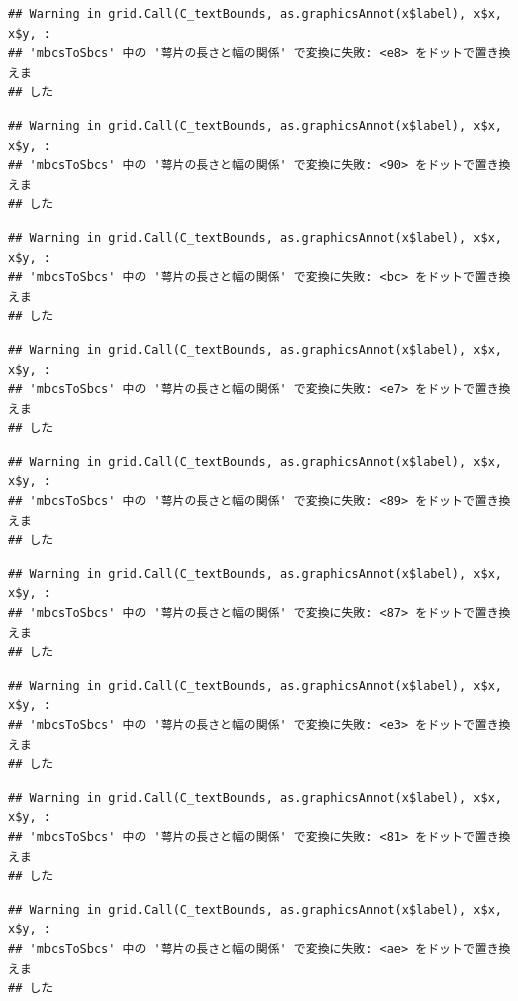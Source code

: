 \documentclass[
]{book}
\begin{document}
\begin{verbatim}
## Warning in grid.Call(C_textBounds, as.graphicsAnnot(x$label), x$x, x$y, :
## 'mbcsToSbcs' 中の '萼片の長さと幅の関係' で変換に失敗: <e8> をドットで置き換えま
## した
\end{verbatim}

\begin{verbatim}
## Warning in grid.Call(C_textBounds, as.graphicsAnnot(x$label), x$x, x$y, :
## 'mbcsToSbcs' 中の '萼片の長さと幅の関係' で変換に失敗: <90> をドットで置き換えま
## した
\end{verbatim}

\begin{verbatim}
## Warning in grid.Call(C_textBounds, as.graphicsAnnot(x$label), x$x, x$y, :
## 'mbcsToSbcs' 中の '萼片の長さと幅の関係' で変換に失敗: <bc> をドットで置き換えま
## した
\end{verbatim}

\begin{verbatim}
## Warning in grid.Call(C_textBounds, as.graphicsAnnot(x$label), x$x, x$y, :
## 'mbcsToSbcs' 中の '萼片の長さと幅の関係' で変換に失敗: <e7> をドットで置き換えま
## した
\end{verbatim}

\begin{verbatim}
## Warning in grid.Call(C_textBounds, as.graphicsAnnot(x$label), x$x, x$y, :
## 'mbcsToSbcs' 中の '萼片の長さと幅の関係' で変換に失敗: <89> をドットで置き換えま
## した
\end{verbatim}

\begin{verbatim}
## Warning in grid.Call(C_textBounds, as.graphicsAnnot(x$label), x$x, x$y, :
## 'mbcsToSbcs' 中の '萼片の長さと幅の関係' で変換に失敗: <87> をドットで置き換えま
## した
\end{verbatim}

\begin{verbatim}
## Warning in grid.Call(C_textBounds, as.graphicsAnnot(x$label), x$x, x$y, :
## 'mbcsToSbcs' 中の '萼片の長さと幅の関係' で変換に失敗: <e3> をドットで置き換えま
## した
\end{verbatim}

\begin{verbatim}
## Warning in grid.Call(C_textBounds, as.graphicsAnnot(x$label), x$x, x$y, :
## 'mbcsToSbcs' 中の '萼片の長さと幅の関係' で変換に失敗: <81> をドットで置き換えま
## した
\end{verbatim}

\begin{verbatim}
## Warning in grid.Call(C_textBounds, as.graphicsAnnot(x$label), x$x, x$y, :
## 'mbcsToSbcs' 中の '萼片の長さと幅の関係' で変換に失敗: <ae> をドットで置き換えま
## した
\end{verbatim}
\end{document}
